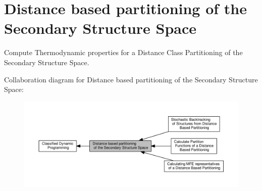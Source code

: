 \hypertarget{group__kl__neighborhood}{}\section{Distance based partitioning of the Secondary Structure Space}
\label{group__kl__neighborhood}


Compute Thermodynamic properties for a Distance Class Partitioning of the Secondary Structure Space.  


Collaboration diagram for Distance based partitioning of the Secondary Structure Space\+:
\nopagebreak
\begin{figure}[H]
\begin{center}
\leavevmode
\includegraphics[width=350pt]{group__kl__neighborhood}
\end{center}
\end{figure}
